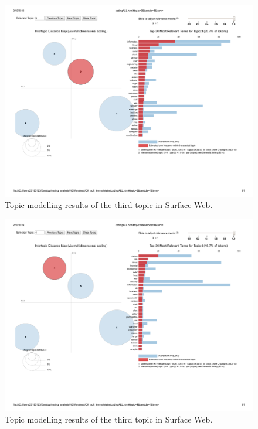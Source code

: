 
\begin{figure}
\begin{center}
\includegraphics[scale=0.4]{./img/codingALL_topic3.pdf}
\end{center}
\caption{Topic modelling results of the third topic in Surface Web.}
\label{fig:topicmodelling_3}
\end{figure}








\begin{figure}
\begin{center}
\includegraphics[scale=0.4]{./img/codingALL_topic4.pdf}
\end{center}
\caption{Topic modelling results of the third topic in Surface Web.}
\label{fig:topicmodelling_4}
\end{figure}






